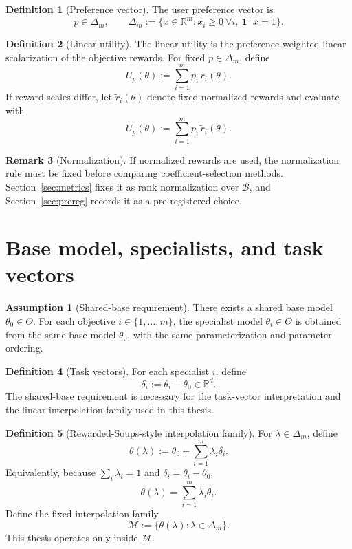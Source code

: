 \documentclass[12pt,a4paper]{report}
\newcommand{\R}{\mathbb{R}}
\newcommand{\1}{\mathbf{1}}
\newcommand{\Bset}{\mathcal{B}}
\newcommand{\Mfam}{\mathcal{M}}
\theoremstyle{definition}
\newtheorem{definition}{Definition}
\newtheorem{remark}[definition]{Remark}
\newtheorem{assumption}{Assumption}
\begin{document}
\begin{definition}[Preference vector]
\label{def:preference}
The user preference vector is
\[
p\in\Delta_m,\qquad
\Delta_m:=\{x\in\R^m:x_i\ge 0\ \forall i,\ \1^\top x=1\}.
\]
\end{definition}

\begin{definition}[Linear utility]
\label{def:utility}
The linear utility is the preference-weighted linear scalarization of the objective rewards.
For fixed \(p\in\Delta_m\), define
\[
U_p(\theta):=\sum_{i=1}^m p_i\,r_i(\theta).
\]
If reward scales differ, let \(\tilde r_i(\theta)\) denote fixed normalized rewards and evaluate with
\[
U_p(\theta):=\sum_{i=1}^m p_i\,\tilde r_i(\theta).
\]
\end{definition}

\begin{remark}[Normalization]
\label{rem:normalization}
If normalized rewards are used, the normalization rule must be fixed before comparing coefficient-selection methods. Section~\ref{sec:metrics} fixes it as rank normalization over \(\Bset\), and Section~\ref{sec:prereg} records it as a pre-registered choice.
\end{remark}

\section{Base model, specialists, and task vectors}

\begin{assumption}[Shared-base requirement]
\label{ass:shared-base}
There exists a shared base model \(\theta_0\in\Theta\). For each objective \(i\in\{1,\dots,m\}\), the specialist model \(\theta_i\in\Theta\) is obtained from the same base model \(\theta_0\), with the same parameterization and parameter ordering.
\end{assumption}

\begin{definition}[Task vectors]
\label{def:task-vectors}
For each specialist \(i\), define
\[
\delta_i:=\theta_i-\theta_0\in\R^d.
\]
The shared-base requirement is necessary for the task-vector interpretation and the linear interpolation family used in this thesis.
\end{definition}

\begin{definition}[Rewarded-Soups-style interpolation family]
\label{def:family}
For \(\lambda\in\Delta_m\), define
\[
\theta(\lambda):=\theta_0+\sum_{i=1}^m \lambda_i\delta_i.
\]
Equivalently, because \(\sum_i\lambda_i=1\) and \(\delta_i=\theta_i-\theta_0\),
\[
\theta(\lambda)=\sum_{i=1}^m \lambda_i\theta_i.
\]
Define the fixed interpolation family
\[
\Mfam:=\{\theta(\lambda):\lambda\in\Delta_m\}.
\]
This thesis operates only inside \(\Mfam\).
\end{definition}
\end{document}
